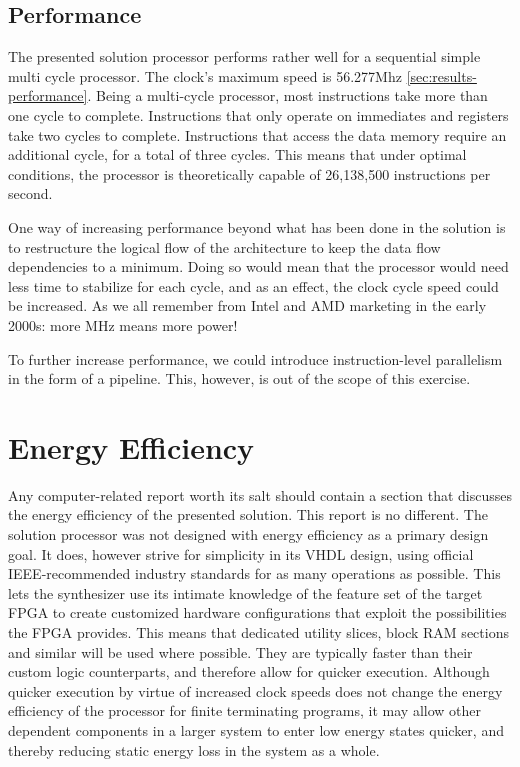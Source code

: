 \subsection{Performance}

The presented solution processor performs rather well for a sequential simple multi cycle processor.
The clock's maximum speed is 56.277Mhz \vref{sec:results-performance}.
Being a multi-cycle processor, most instructions take more than one cycle to complete.
Instructions that only operate on immediates and registers take two cycles to complete.
Instructions that access the data memory require an additional cycle, for a total of three cycles.
This means that under optimal conditions, the processor is theoretically capable of 26,138,500 instructions per second.

One way of increasing performance beyond what has been done in the solution is to restructure the logical flow of the architecture to keep the data flow dependencies to a minimum.
Doing so would mean that the processor would need less time to stabilize for each cycle, and as an effect, the clock cycle speed could be increased.
As we all remember from Intel and AMD marketing in the early 2000s: more MHz means more power!

To further increase performance, we could introduce instruction-level parallelism in the form of a pipeline.
This, however, is out of the scope of this exercise.

\section{Energy Efficiency}

Any computer-related report worth its salt should contain a section that discusses the energy efficiency of the presented solution.
This report is no different.
The solution processor was not designed with energy efficiency as a primary design goal.
It does, however strive for simplicity in its VHDL design, using official IEEE-recommended industry standards for as many operations as possible.
This lets the synthesizer use its intimate knowledge of the feature set of the target FPGA to create customized hardware configurations that exploit the possibilities the FPGA provides.
This means that dedicated utility slices, block RAM sections and similar will be used where possible.
They are typically faster than their custom logic counterparts, and therefore allow for quicker execution.
Although quicker execution by virtue of increased clock speeds does not change the energy efficiency of the processor for finite terminating programs, it may allow other dependent components in a larger system to enter low energy states quicker, and thereby reducing static energy loss in the system as a whole.

